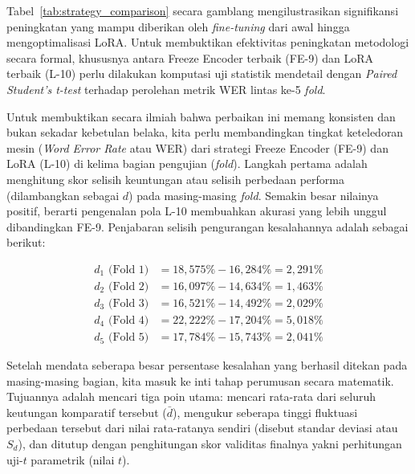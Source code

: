 Tabel~\ref{tab:strategy_comparison} secara gamblang mengilustrasikan signifikansi peningkatan yang mampu diberikan oleh \textit{fine-tuning} dari awal hingga mengoptimalisasi LoRA. Untuk membuktikan efektivitas peningkatan metodologi secara formal, khususnya antara Freeze Encoder terbaik (FE-9) dan LoRA terbaik (L-10) perlu dilakukan komputasi uji statistik mendetail dengan \textit{Paired Student's t-test} terhadap perolehan metrik WER lintas ke-5 \textit{fold}.

Untuk membuktikan secara ilmiah bahwa perbaikan ini memang konsisten dan bukan sekadar kebetulan belaka, kita perlu membandingkan tingkat keteledoran mesin (\textit{Word Error Rate} atau WER) dari strategi Freeze Encoder (FE-9) dan LoRA (L-10) di kelima bagian pengujian (\textit{fold}). Langkah pertama adalah menghitung skor selisih keuntungan atau selisih perbedaan performa (dilambangkan sebagai $d$) pada masing-masing \textit{fold}. Semakin besar nilainya positif, berarti pengenalan pola L-10 membuahkan akurasi yang lebih unggul dibandingkan FE-9. Penjabaran selisih pengurangan kesalahannya adalah sebagai berikut:

\vspace{1cm}
\begin{equation}
\label{eq:ttest_diff}
\begin{aligned}
    d_1 \text{ (Fold 1)} &= 18,575\% - 16,284\% = 2,291\% \\
    d_2 \text{ (Fold 2)} &= 16,097\% - 14,634\% = 1,463\% \\
    d_3 \text{ (Fold 3)} &= 16,521\% - 14,492\% = 2,029\% \\
    d_4 \text{ (Fold 4)} &= 22,222\% - 17,204\% = 5,018\% \\
    d_5 \text{ (Fold 5)} &= 17,784\% - 15,743\% = 2,041\%
\end{aligned}
\end{equation}

\vspace{1cm}
Setelah mendata seberapa besar persentase kesalahan yang berhasil ditekan pada masing-masing bagian, kita masuk ke inti tahap perumusan secara matematik. Tujuannya adalah mencari tiga poin utama: mencari rata-rata dari seluruh keutungan komparatif tersebut ($\bar{d}$), mengukur seberapa tinggi fluktuasi perbedaan tersebut dari nilai rata-ratanya sendiri (disebut standar deviasi atau $S_d$), dan ditutup dengan penghitungan skor validitas finalnya yakni perhitungan uji-$t$ parametrik (nilai $t$).

